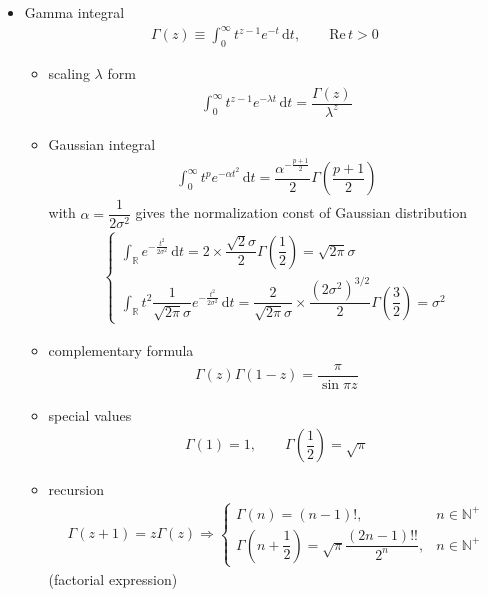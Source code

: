 \begin{itemize}[topsep=2pt,itemsep=0pt]
    \item Gamma integral
    \begin{align}
        \Gamma (z)\equiv \int_{0}^\infty t^{z-1}e^{-t}\,\mathrm{d}t,\qquad \mathrm{Re}\,t>0 
    \end{align}
    \begin{itemize}[topsep=2pt,itemsep=0pt]
        \item scaling $ \lambda  $ form
    \begin{align}
        \int_{0}^\infty t^{z-1}e^{-\lambda t}\,\mathrm{d}t=\dfrac{\Gamma (z)}{\lambda ^z}
    \end{align}
    \item Gaussian integral
    \begin{align}
        \int_0^\infty t^{p}e^{-\alpha t^2}\,\mathrm{d}t= \dfrac{\alpha^{-\frac{p+1}{2}}}{2} \Gamma(\dfrac{p+1}{2})
    \end{align}
    with $ \alpha =\dfrac{1}{2\sigma ^2} $ gives the normalization const of Gaussian distribution
    \begin{align}
        \begin{cases}
            \int_\mathbb{R}e^{-\frac{t^2}{2\sigma ^2}}\,\mathrm{d}t=2\times \dfrac{\sqrt{2}\sigma }{2}\Gamma (\dfrac{1}{2})={\sqrt{2\pi}\sigma }\\
            \int_\mathbb{R}t^2 \dfrac{1}{\sqrt{2\pi}\sigma }e^{-\frac{t^2}{2\sigma ^2}}\,\mathrm{d}t=\dfrac{2}{\sqrt{2\pi}\sigma  }\times \dfrac{(2\sigma^2 )^{3/2}}{2}\Gamma (\dfrac{3}{2}) =\sigma ^2
        \end{cases}
    \end{align}
    
    
    
    
    \item complementary formula
    \begin{align}
        \Gamma (z)\Gamma (1-z)=\dfrac{\pi}{\sin \pi z} 
    \end{align}
    \item special values
    \begin{align}
        \Gamma (1)=1,\qquad \Gamma (\dfrac{1}{2})=\sqrt{\pi} 
    \end{align}
    \item recursion 
    \begin{align}
        \Gamma (z+1)=z\Gamma (z)\Rightarrow\begin{cases}
            \Gamma (n)=(n-1)!,&n\in\mathbb{N}^+\\
            \Gamma (n+\dfrac{1}{2})=\sqrt{\pi}\dfrac{(2n-1)!!}{2^n},&n\in\mathbb{N}^+
        \end{cases} 
    \end{align}
    (factorial expression)
    \end{itemize}
    

\end{itemize}
